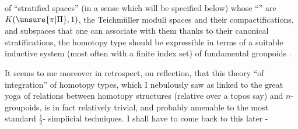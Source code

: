 of ``stratified spaces'' (in a sense which
will be specified below) whose
``'' are $K(\unsure{\pi|\Pi},1)$, 
the Teichmüller moduli spaces
and their compactifications, and  subspaces
that one can associate with them thanks to their
canonical stratifications, the homotopy
type should be expressible
in terms of a suitable inductive
system (most often with a finite index
set) of fundamental groupoids
 .

It seems to me moreover in retrospect,
on reflection, that this theory ``of integration''
of homotopy types, which I nebulously
saw as linked to the great yoga of
relations between homotopy structures (relative
over a topos say) and $n$-groupoids,
is in fact relatively trivial, and
probably amenable to the most standard $\frac12$-
simplicial techniques. I shall
have to come back to this later -

